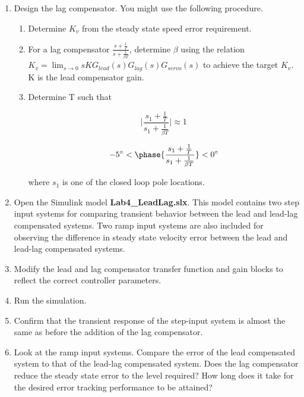 \documentclass[11pt,a4paper]{article}
\begin{document}
\begin{enumerate}

\item Design the lag compensator. You might use the following procedure.

\begin{enumerate}

\item Determine $K_{v}$ from the steady state speed error requirement.

\item For a lag compensator $\frac{s+\frac{1}{T}}{s+\frac{1}{\beta T}}$, determine $\beta$ using the relation $K_{v} = \lim_{s \to 0} s K G_{lead}(s) G_{lag}(s) G_{servo}(s)$ to achieve the target $K_{v}$. K is the lead compensator gain.

\item Determine T such that 

\begin{equation}
\lvert \frac{s_{1}+\frac{1}{T}}{s_{1} + \frac{1}{\beta T}} \rvert \approx 1
\end{equation}

\begin{equation}
-5 \degree < \phase{\frac{s_{1}+\frac{1}{T}}{s_{1} + \frac{1}{\beta T}}} < 0 \degree
\end{equation}

where $s_{1}$ is one of the closed loop pole locations.

\end{enumerate}

\item Open the Simulink model \textbf{Lab4\_LeadLag.slx}. This model contains two step input systems for comparing transient behavior between the lead and lead-lag compensated systems. Two ramp input systems are also included for observing the difference in steady state velocity error between the lead and lead-lag compensated systems.

\item Modify the lead and lag compensator transfer function  and gain blocks to reflect the correct controller parameters.

\item Run the simulation.

\item Confirm that the transient response of the step-input system is almost the same as before the addition of the lag compensator.

\item Look at the ramp input systems. Compare the error of the lead compensated system to that of the lead-lag compensated system. Does the lag compensator reduce the steady state error to the level required? How long does it take for the desired error tracking performance to be attained?

\end{enumerate}
\end{document}
